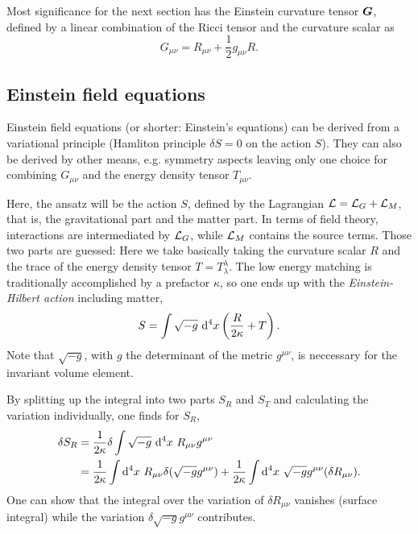 \documentclass[12pt,a4paper]{report}
\numberwithin{equation}{chapter}
\begin{document}
Most significance for the next section has the Einstein curvature tensor $\boldsymbol{ G }$, defined by a linear combination of the Ricci tensor and the curvature scalar as
\begin{equation}
G_{\mu\nu} = R_{\mu\nu}+ \frac{1}{2} g_{\mu\nu} R.
\end{equation}

\subsection{Einstein field equations}\label{sec:deriving-efe}
Einstein field equations (or shorter: Einstein's equations) can be derived from a variational principle (Hamliton principle $\delta S=0$ on the action $S$). They can also be derived by other means, e.g. symmetry aspects leaving only one choice for combining $G_{\mu\nu}$ and the energy density tensor $T_{\mu\nu}$. 
%
%

Here, the ansatz will be the action $S$, defined by the Lagrangian ${\cal L} = {\cal L}_G + {\cal L}_M$, that is, the gravitational part and the matter part. In terms of field theory, interactions are intermediated by ${\cal L}_G$, while ${\cal L}_M$ contains the source terms. Those two parts are guessed: Here we take basically taking the curvature scalar $R$ and the trace of the energy density tensor $T=T^\lambda_\lambda$. The low energy matching is traditionally accomplished by a prefactor $\kappa$, so one ends up with the \emph{Einstein-Hilbert action} including matter,
\begin{equation}\label{eq:Einstein-Hilbert-action}
S = \int \sqrt{-g}~\mathrm{d}^4 x \left(\frac{R}{2\kappa} + T\right).
\end{equation}
Note that $\sqrt{-g}$, with $g$ the determinant of the metric $g^{\mu\nu}$, is neccessary for the invariant volume element.

By splitting up the integral into two parts $S_R$ and $S_T$ and calculating the variation individually, one finds for $S_R$,
\begin{align}
\delta S_R &= \frac{1}{2\kappa} \delta \int \sqrt{-g}~\mathrm{d}^4 x~R_{\mu\nu}g^{\mu\nu} \\
&=
\frac{1}{2\kappa} \int \mathrm{d}^4 x~R_{\mu\nu} \delta (\sqrt{-g} g^{\mu\nu})
+
\frac{1}{2\kappa} \int \mathrm{d}^4 x~ \sqrt{-g} g^{\mu\nu} (\delta R_{\mu\nu}).
\end{align}
One can show that the integral over the variation of $\delta R_{\mu\nu}$ vanishes (surface integral) while the variation $\delta \sqrt{-g} g^{\mu\nu}$ contributes.
\end{document}

